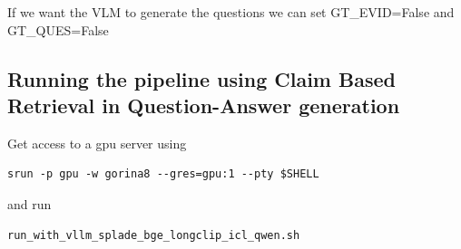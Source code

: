 If we want the VLM to generate the questions we can set GT\_EVID=False and GT\_QUES=False

\subsection{Running the pipeline using Claim Based Retrieval in Question-Answer generation}

Get access to a gpu server using
\begin{verbatim}
srun -p gpu -w gorina8 --gres=gpu:1 --pty $SHELL
\end{verbatim}

and run 

\begin{verbatim}
run_with_vllm_splade_bge_longclip_icl_qwen.sh
\end{verbatim}
